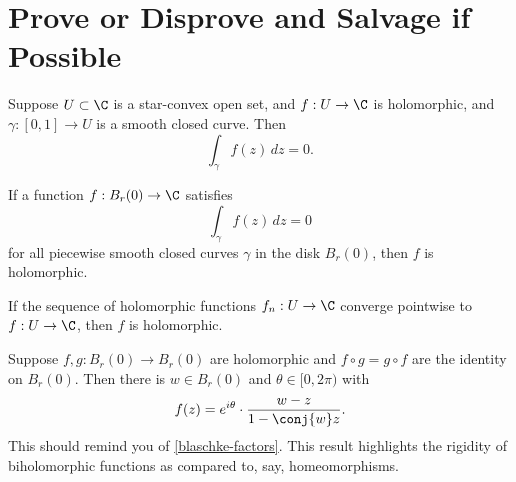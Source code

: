 \documentclass{homework}
\begin{document}
\section{Prove or Disprove and Salvage if Possible}

\begin{problem}\label{cauchy-for-starlike}Suppose $U \subset \C$ is a
  star-convex open set, and $f : U \to \C$ is holomorphic, and
  $\gamma : [0,1] \to U$ is a smooth closed curve.  Then
  \[
    \int_\gamma f(z) \, dz = 0.
  \]
\end{problem}

\begin{problem}\label{moreras-theorem}If a function $f : B_r(0) \to \C$
  satisfies %
  \[
    \int_\gamma f(z) \, dz = 0
  \]
  for all piecewise smooth closed curves $\gamma$ in the disk
  $B_r(0)$, then $f$ is holomorphic.
\end{problem}

\begin{problem}\label{uniform-convergence-holomorphic}If the sequence of
  holomorphic functions $f_n : U \to \C$ converge pointwise to
  $f : U \to \C$, then $f$ is holomorphic.
\end{problem}

\begin{problem}\label{automorphisms-of-disk}Suppose $f, g : B_r(0) \to B_r(0)$ are holomorphic and
  $f \circ g = g \circ f$ are the identity on $B_r(0)$.  Then there is
  $w \in B_r(0)$ and $\theta \in [0,2\pi)$ with
  \[
    f(z) = e^{i\theta} \cdot \frac{w - z}{1 - \conj{w}z}.
  \]
  This should remind you of \ref{blaschke-factors}.  This result
  highlights the rigidity of biholomorphic functions as compared to,
  say, homeomorphisms.
\end{problem}
\end{document}
